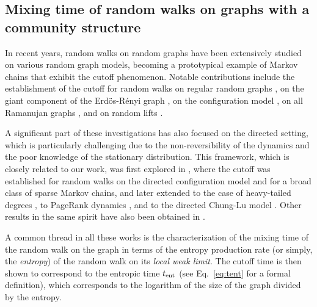 \documentclass[11pt,oneside]{amsart}
\numberwithin{equation}{section}  %
\theoremstyle{plain}
\newcommand{\tent}{t_{\textup{ent}}}
\begin{document}
\subsection{Mixing time of random walks on graphs with a community structure}

In recent years, random walks on random graphs have been extensively
studied on various random graph models, becoming a prototypical example
of Markov chains that exhibit the cutoff phenomenon. 
Notable contributions include the establishment of the cutoff for 
 random walks on regular random graphs \cite{LSrrg}, on the giant component of the Erd\"os-Rényi graph \cite{BLPS}, 
on the configuration model \cite{BLPS,BHS,BHLP}, 
on all Ramanujan graphs \cite{LP16}, and on random lifts \cite{BL22,CK22}.  

A significant part of these investigations has also focused
on the directed setting, which is particularly challenging due to
the non-reversibility of the dynamics and the poor knowledge
of the stationary distribution.
This framework, which is closely related to our work, 
was first explored in \cite{BCS1,BCS2}, 
where the cutoff was established for random walks on the directed configuration model and for a broad class of sparse Markov chains, 
and later extended to the case of heavy-tailed degrees \cite{CCPQ}, to PageRank dynamics \cite{CQ21a}, and to the directed Chung-Lu model \cite{BP}. Other results in the same spirit have also been obtained in \cite{BL22,Dub1,Dub2}.

A common thread in all these works is the characterization of the mixing time of the random walk on the graph
in terms of the entropy production rate (or simply, the \emph{entropy}) of the random walk on its \emph{local weak limit}.
The cutoff time is then shown to correspond
to the entropic time $\tent$ (see Eq.~\eqref{eq:tent} for a formal definition),
 which corresponds to the logarithm of the size of the graph divided by the entropy.
\end{document}
